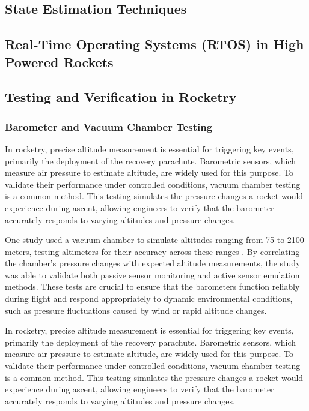 \subsection{State Estimation Techniques}
\subsection{Real-Time Operating Systems (RTOS) in High Powered Rockets}
\subsection{Testing and Verification in Rocketry}

\subsubsection{Barometer and Vacuum Chamber Testing}
In rocketry, precise altitude measurement is essential for triggering key events, primarily the deployment of the recovery parachute. Barometric sensors, which measure air pressure to estimate altitude, are widely used for this purpose. To validate their performance under controlled conditions, vacuum chamber testing is a common method. This testing simulates the pressure changes a rocket would experience during ascent, allowing engineers to verify that the barometer accurately responds to varying altitudes and pressure changes. 

One study used a vacuum chamber to simulate altitudes ranging from 75 to 2100 meters, testing altimeters for their accuracy across these ranges \cite{NAR-58}. By correlating the chamber's pressure changes with expected altitude measurements, the study was able to validate both passive sensor monitoring and active sensor emulation methods. These tests are crucial to ensure that the barometers function reliably during flight and respond appropriately to dynamic environmental conditions, such as pressure fluctuations caused by wind or rapid altitude changes.

In rocketry, precise altitude measurement is essential for triggering key events, primarily the deployment of the recovery parachute. Barometric sensors, which measure air pressure to estimate altitude, are widely used for this purpose. To validate their performance under controlled conditions, vacuum chamber testing is a common method. This testing simulates the pressure changes a rocket would experience during ascent, allowing engineers to verify that the barometer accurately responds to varying altitudes and pressure changes. 

